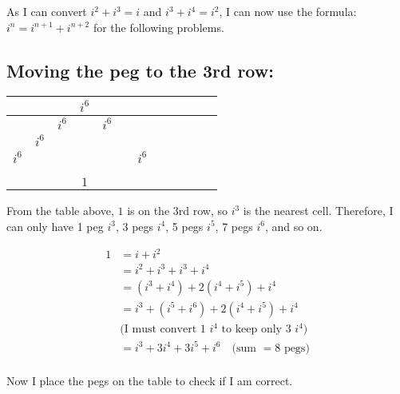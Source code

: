 \documentclass[12pt]{article}
\begin{document}
\noindent *As I can convert $i^2+i^3=i$ and $i^3+i^4=i^2$, I can now use the formula: $i^n=i^{n+1}+i^{n+2}$ for the following problems.

\vspace{1cm}

\subsection*{Moving the peg to the 3rd row:}
\begin{center}
\begin{tabular}{|l|c|c|c|c|c|c|c|c|c|c|r|}
    \hline
    & & & $i^6$ & & & \\
    \hline
    & & $i^6$ & \color{blue}{$i^5$} & $i^6$ & & \\
    \hline
    & $i^6$ & \color{blue}{$i^5$} & \color{black}{$i^4$} & \color{blue}{$i^5$} & \color{black}{$i^6$} & \\
    \hline
    $i^6$ & \color{blue}{$i^5$} & \color{black}{$i^4$} & \color{blue}{$i^3$} & \color{black}{$i^4$} & \color{blue}{$i^5$} & $i^6$ \\
    \hline
    & & & & & &\\
    \hline
    & & & & & &\\
    \hline
    & & & $1$ & & &\\
    \hline
\end{tabular}
\end{center}

\noindent From the table above, $1$ is on the 3rd row, so $i^3$ is the nearest cell. Therefore, I can only have 1 peg $i^3$, 3 pegs $i^4$, 5 pegs $i^5$, 7 pegs $i^6$, and so on.

\begin{align*}
    1&=i+i^2\\
    &= i^2+i^3+i^3+i^4\\
    &= \left(i^3+i^4\right)+2\left(i^4+i^5\right)+i^4\\
    &=i^3+ \left(i^5+i^6\right)+2\left(i^4+i^5\right)+i^4\\
    &\text{(I must convert 1 $i^4$ to keep only 3 $i^4$)}\\
    &=i^3+ 3i^4+ 3i^5+ i^6 \quad\text{(sum $=8$ pegs)}\\
\end{align*}

\noindent Now I place the pegs on the table to check if I am correct.
\end{document}
